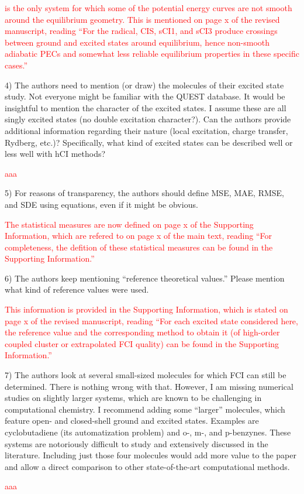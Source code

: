 \documentclass[10pt]{letter}
\newcommand{\alert}[1]{\textcolor{red}{#1}}
\begin{document}
\begin{letter}
\alert{
 is the only system for which some of the potential energy curves are not smooth around the equilibrium geometry.
This is mentioned on page x of the revised manuscript, reading
``For the \ce{CN} radical, CIS, sCI1, and sCI3 produce crossings between ground and excited states around equilibrium, hence non-smooth adiabatic PECs
and somewhat less reliable equilibrium properties in these specific cases.''
}

{4) The authors need to mention (or draw) the molecules of their excited state study. Not everyone might be familiar with the QUEST database. It would be insightful to mention the character of the excited states. I assume these are all singly excited states (no double excitation character?). Can the authors provide additional information regarding their nature (local excitation, charge transfer, Rydberg, etc.)? Specifically, what kind of excited states can be described well or less well with hCI methods?
}

\alert{
aaa
}

\clearpage

{5) For reasons of transparency, the authors should define MSE, MAE, RMSE, and SDE using equations, even if it might be obvious.
}

\alert{
The statistical measures are now defined on page x of the Supporting Information, which are refered to on page x of the main text, reading
``For completeness, the defition of these statistical measures can be found in the Supporting Information.''
}

{6) The authors keep mentioning ``reference theoretical values.'' Please mention what kind of reference values were used.
}

\alert{
This information is provided in the Supporting Information, which is stated on page x of the revised manuscript, reading
``For each excited state considered here, the reference value and the corresponding method to obtain it (of high-order coupled cluster or extrapolated FCI quality) can be found in the Supporting Information.''
}

{7) The authors look at several small-sized molecules for which FCI can still be determined. There is nothing wrong with that. However, I am missing numerical studies on slightly larger systems, which are known to be challenging in computational chemistry. I recommend adding some ``larger'' molecules, which feature open- and closed-shell ground and excited states. Examples are cyclobutadiene (its automatization problem) and o-, m-, and p-benzynes. These systems are notoriously difficult to study and extensively discussed in the literature. Including just those four molecules would add more value to the paper and allow a direct comparison to other state-of-the-art computational methods.
}

\alert{
aaa
}

\end{letter}
\end{document}
